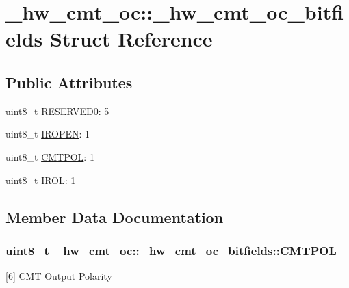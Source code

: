 \hypertarget{struct__hw__cmt__oc_1_1__hw__cmt__oc__bitfields}{}\section{\+\_\+hw\+\_\+cmt\+\_\+oc\+:\+:\+\_\+hw\+\_\+cmt\+\_\+oc\+\_\+bitfields Struct Reference}
\label{struct__hw__cmt__oc_1_1__hw__cmt__oc__bitfields}
\subsection*{Public Attributes}
\begin{DoxyCompactItemize}
\item 
uint8\+\_\+t \hyperlink{struct__hw__cmt__oc_1_1__hw__cmt__oc__bitfields_af44f921c9cf80708fe73a6dda8bc950e}{R\+E\+S\+E\+R\+V\+E\+D0}\+: 5
\item 
uint8\+\_\+t \hyperlink{struct__hw__cmt__oc_1_1__hw__cmt__oc__bitfields_a77f6c985c653dad5faba1b75527c1d01}{I\+R\+O\+P\+EN}\+: 1
\item 
uint8\+\_\+t \hyperlink{struct__hw__cmt__oc_1_1__hw__cmt__oc__bitfields_a462021c86227a2ad60a08d75f2b25efa}{C\+M\+T\+P\+OL}\+: 1
\item 
uint8\+\_\+t \hyperlink{struct__hw__cmt__oc_1_1__hw__cmt__oc__bitfields_a7c8f9edca6a8700dbb4d48b572400939}{I\+R\+OL}\+: 1
\end{DoxyCompactItemize}


\subsection{Member Data Documentation}
\subsubsection[{\texorpdfstring{C\+M\+T\+P\+OL}{CMTPOL}}]{\setlength{\rightskip}{0pt plus 5cm}uint8\+\_\+t \+\_\+hw\+\_\+cmt\+\_\+oc\+::\+\_\+hw\+\_\+cmt\+\_\+oc\+\_\+bitfields\+::\+C\+M\+T\+P\+OL}\hypertarget{struct__hw__cmt__oc_1_1__hw__cmt__oc__bitfields_a462021c86227a2ad60a08d75f2b25efa}{}\label{struct__hw__cmt__oc_1_1__hw__cmt__oc__bitfields_a462021c86227a2ad60a08d75f2b25efa}
\mbox{[}6\mbox{]} C\+MT Output Polarity 
